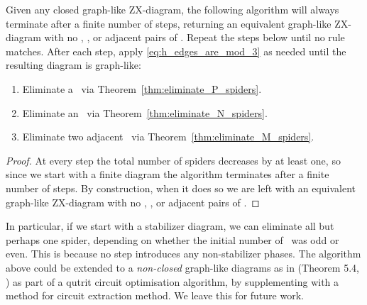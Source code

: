 \begin{theorem}\label{thm:simplification_algorithm_works}
	Given any closed graph-like ZX-diagram, the following algorithm will always terminate after a finite number of steps, returning an equivalent graph-like ZX-diagram with no \Nspiders, \Pspiders, or adjacent pairs of \Mspiders. Repeat the steps below until no rule matches. After each step, apply \eqref{eq:h_edges_are_mod_3} as needed until the resulting diagram is graph-like:
	\begin{enumerate}
		\item Eliminate a \Pspider\ via Theorem~\ref{thm:eliminate_P_spiders}.
		\item Eliminate an \Nspider\ via Theorem~\ref{thm:eliminate_N_spiders}.
		\item Eliminate two adjacent \Mspiders\ via Theorem~\ref{thm:eliminate_M_spiders}.
	\end{enumerate}
	\begin{proof}
		At every step the total number of spiders decreases by at least one, so since we start with a finite diagram the algorithm terminates after a finite number of steps. By construction, when it does so we are left with an equivalent graph-like ZX-diagram with no \Nspiders, \Pspiders, or adjacent pairs of \Mspiders.
	\end{proof}
\end{theorem}
In particular, if we start with a stabilizer diagram, we can eliminate all but perhaps one spider, depending on whether the initial number of \Mspiders\ was odd or even. This is because no step introduces any non-stabilizer phases. The algorithm above could be extended to a \emph{non-closed} graph-like diagrams as in (Theorem 5.4, \cite{graph_theoretic_simplification}) as part of a qutrit circuit optimisation algorithm, by supplementing with a method for circuit extraction method. We leave this for future work.
